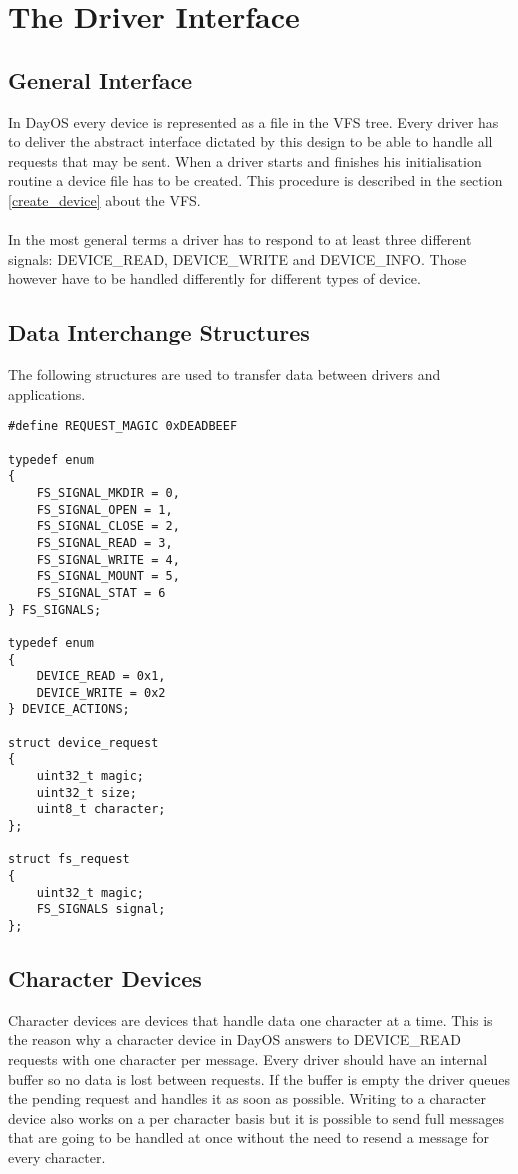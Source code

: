 \section{The Driver Interface}
\subsection{General Interface}
In DayOS every device is represented as a file in the VFS tree. Every driver has to deliver
the abstract interface dictated by this design to be able to handle all requests that may
be sent. When a driver starts and finishes his initialisation routine a device file has to be
created. This procedure is described in the section \ref{create_device} about the VFS. \\ \\
In the most general terms a driver has to respond to at least three different signals:
DEVICE\_READ, DEVICE\_WRITE and DEVICE\_INFO. Those however have to be handled differently
for different types of device.

\subsection{Data Interchange Structures}
The following structures are used to transfer data between drivers and applications.
\begin{verbatim}
#define REQUEST_MAGIC 0xDEADBEEF

typedef enum
{
	FS_SIGNAL_MKDIR = 0,
	FS_SIGNAL_OPEN = 1,
	FS_SIGNAL_CLOSE = 2,
	FS_SIGNAL_READ = 3,
	FS_SIGNAL_WRITE = 4,
	FS_SIGNAL_MOUNT = 5,
	FS_SIGNAL_STAT = 6
} FS_SIGNALS;

typedef enum
{
	DEVICE_READ = 0x1,
	DEVICE_WRITE = 0x2
} DEVICE_ACTIONS;

struct device_request
{
    uint32_t magic;
    uint32_t size;
    uint8_t character;
};

struct fs_request
{
    uint32_t magic;
    FS_SIGNALS signal;    
};

\end{verbatim}

\subsection{Character Devices}
Character devices are devices that handle data one character at a time. This is the reason why
a character device in DayOS answers to DEVICE\_READ requests with one character per message.
Every driver should have an internal buffer so no data is lost between requests. If the
buffer is empty the driver queues the pending request and handles it as soon as possible.
Writing to a character device also works on a per character basis but it is possible to
send full messages that are going to be handled at once without the need to resend a message
for every character.

